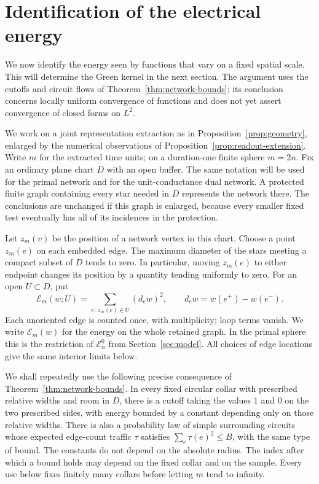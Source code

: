 \section{Identification of the electrical energy}\label{sec:conductivity}

We now identify the energy seen by functions that vary on a fixed spatial
scale.  This will determine the Green kernel in the next section.  The
argument uses the cutoffs and circuit flows of
Theorem~\ref{thm:network-bounds}; its conclusion concerns locally uniform
convergence of functions and does not yet assert convergence of closed forms
on \(L^2\).

We work on a joint representation extraction as in
Proposition~\ref{prop:geometry}, enlarged by the numerical observations of
Proposition~\ref{prop:readout-extension}.  Write \(m\) for the extracted
time units; on a duration-one finite sphere \(m=2n\).  Fix an ordinary plane
chart \(D\) with an open buffer.  The same notation will be used for the
primal network and for the unit-conductance dual network.  A protected finite
graph containing every star needed in \(D\) represents the network there.
The conclusions are unchanged if this graph is enlarged, because every
smaller fixed test eventually has all of its incidences in the protection.

Let \(z_m(v)\) be the position of a network vertex in this chart.  Choose a
point \(z_m(e)\) on each embedded edge.  The maximum diameter of the stars
meeting a compact subset of \(D\) tends to zero.  In particular, moving
\(z_m(e)\) to either endpoint changes its position by a quantity tending
uniformly to zero.  For an open \(U\subset D\), put
\begin{equation}\label{eq:local-network-energy}
 \mathcal E_m(w;U)
   =\sum_{e:\,z_m(e)\in U}(d_e w)^2,
 \qquad d_e w=w(e^+)-w(e^-).
\end{equation}
Each unoriented edge is counted once, with multiplicity; loop terms vanish.
We write \(\mathcal E_m(w)\) for the energy on the whole retained graph.
In the primal sphere this is the restriction of \(\mathcal E_n^0\) from
Section~\ref{sec:model}.  All choices of edge locations give the same
interior limits below.

We shall repeatedly use the following precise consequence of
Theorem~\ref{thm:network-bounds}.  In every fixed circular collar with
prescribed relative widths and room in \(D\), there is a cutoff taking the
values \(1\) and \(0\) on the two prescribed sides, with energy bounded by a
constant depending only on those relative widths.  There is also a
probability law of simple surrounding circuits whose expected edge-count
traffic \(\tau\) satisfies \(\sum_e\tau(e)^2\le B\), with the same type of
bound.  The constants do not depend on the absolute radius.  The index
after which a bound holds may depend on the fixed collar and on the sample.
Every use below fixes finitely many collars before letting \(m\) tend to
infinity.

